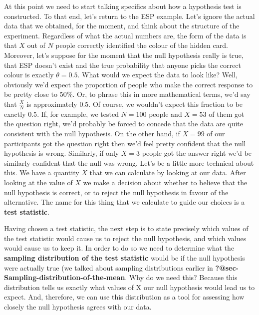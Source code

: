 \documentclass[
  a4paper,
]{book}
\begin{document}
At this point we need to start talking specifics about how a hypothesis
test is constructed. To that end, let's return to the ESP example. Let's
ignore the actual data that we obtained, for the moment, and think about
the structure of the experiment. Regardless of what the actual numbers
are, the form of the data is that \(X\) out of \(N\) people correctly
identified the colour of the hidden card. Moreover, let's suppose for
the moment that the null hypothesis really is true, that ESP doesn't
exist and the true probability that anyone picks the correct colour is
exactly \(\theta = 0.5\). What would we expect the data to look like?
Well, obviously we'd expect the proportion of people who make the
correct response to be pretty close to \(50\%\). Or, to phrase this in
more mathematical terms, we'd say that \(\frac{X}{N}\) is approximately
\(0.5\). Of course, we wouldn't expect this fraction to be exactly
\(0.5\). If, for example, we tested \(N = 100\) people and \(X = 53\) of
them got the question right, we'd probably be forced to concede that the
data are quite consistent with the null hypothesis. On the other hand,
if \(X = 99\) of our participants got the question right then we'd feel
pretty confident that the null hypothesis is wrong. Similarly, if only
\(X = 3\) people got the answer right we'd be similarly confident that
the null was wrong. Let's be a little more technical about this. We have
a quantity \(X\) that we can calculate by looking at our data. After
looking at the value of \(X\) we make a decision about whether to
believe that the null hypothesis is correct, or to reject the null
hypothesis in favour of the alternative. The name for this thing that we
calculate to guide our choices is a \textbf{test statistic}.

Having chosen a test statistic, the next step is to state precisely
which values of the test statistic would cause us to reject the null
hypothesis, and which values would cause us to keep it. In order to do
so we need to determine what the \textbf{sampling distribution of the
test statistic} would be if the null hypothesis were actually true (we
talked about sampling distributions earlier in
\textbf{?@sec-Sampling-distribution-of-the-mean}. Why do we need this?
Because this distribution tells us exactly what values of X our null
hypothesis would lead us to expect. And, therefore, we can use this
distribution as a tool for assessing how closely the null hypothesis
agrees with our data.
\end{document}
